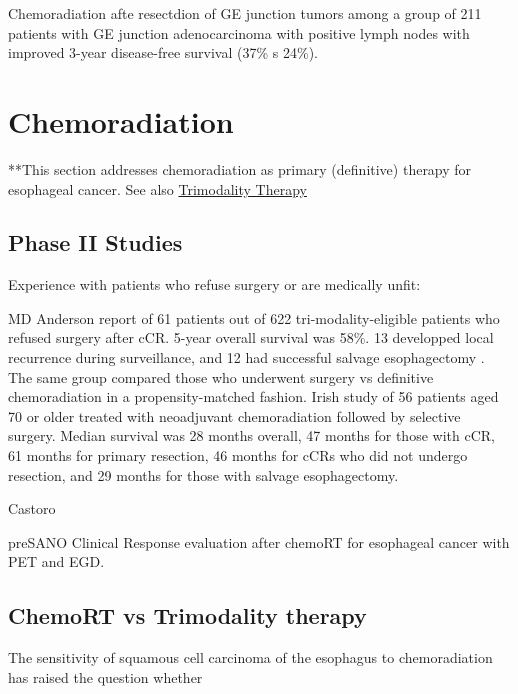 \documentclass[
]{book}
\begin{document}
Chemoradiation afte resectdion of GE junction tumors \citep{kofoed26} among a group of 211 patients with GE junction adenocarcinoma with positive lymph nodes with improved 3-year disease-free survival (37\% s 24\%).

\hypertarget{eso_dcrt}{%
\chapter{Chemoradiation}\label{eso_dcrt}}

**This section addresses chemoradiation as primary (definitive) therapy for esophageal cancer. See also \protect\hyperlink{trimodality}{Trimodality Therapy}

\hypertarget{phase-ii-studies}{%
\section{Phase II Studies}\label{phase-ii-studies}}

Experience with patients who refuse surgery or are medically unfit:

MD Anderson report of 61 patients out of 622 tri-modality-eligible patients who refused surgery after cCR. 5-year overall survival was 58\%. 13 developped local recurrence during surveillance, and 12 had successful salvage esophagectomy \citep{taketa300}. The same group compared those who underwent surgery vs definitive chemoradiation in a propensity-matched fashion\citep{taketa95}. Irish study of 56 patients aged 70 or older treated with neoadjuvant chemoradiation followed by selective surgery. Median survival was 28 months overall, 47 months for those with cCR, 61 months for primary resection, 46 months for cCRs who did not undergo resection, and 29 months for those with salvage esophagectomy\citep{furlong107}.

Castoro\citep{castoro1375}

preSANO\citep{chirieac1347} Clinical Response evaluation after chemoRT for esophageal cancer with PET and EGD.

\hypertarget{chemort-vs-trimodality-therapy}{%
\section{ChemoRT vs Trimodality therapy}\label{chemort-vs-trimodality-therapy}}

The sensitivity of squamous cell carcinoma of the esophagus to chemoradiation has raised the question whether
\end{document}
